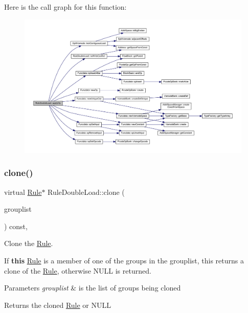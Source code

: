 Here is the call graph for this function\+:
\nopagebreak
\begin{figure}[H]
\begin{center}
\leavevmode
\includegraphics[width=350pt]{class_rule_double_load_afbb821bf5ea445001a47351ec57bbeb1_cgraph}
\end{center}
\end{figure}
\mbox{\label{class_rule_double_load_ac2d2342f59e7a6813b83457fe14ca386}} 
\subsubsection{\texorpdfstring{clone()}{clone()}}
{\footnotesize\ttfamily virtual \mbox{\hyperlink{class_rule}{Rule}}$\ast$ Rule\+Double\+Load\+::clone (\begin{DoxyParamCaption}\item[{const \mbox{\hyperlink{class_action_group_list}{Action\+Group\+List}} \&}]{grouplist }\end{DoxyParamCaption}) const\hspace{0.3cm}{\ttfamily [inline]}, {\ttfamily [virtual]}}



Clone the \mbox{\hyperlink{class_rule}{Rule}}. 

If {\bfseries{this}} \mbox{\hyperlink{class_rule}{Rule}} is a member of one of the groups in the grouplist, this returns a clone of the \mbox{\hyperlink{class_rule}{Rule}}, otherwise N\+U\+LL is returned. 
\begin{DoxyParams}{Parameters}
{\em grouplist} & is the list of groups being cloned \\
\hline
\end{DoxyParams}
\begin{DoxyReturn}{Returns}
the cloned \mbox{\hyperlink{class_rule}{Rule}} or N\+U\+LL 
\end{DoxyReturn}


